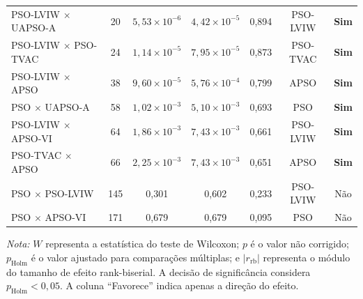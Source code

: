 \begin{table}[!htbp]
{\begin{tabular}{lcccccc}
            PSO-LVIW $\times$ UAPSO-A
            & 20
            & $5{,}53 \times 10^{-6}$
            & $4{,}42 \times 10^{-5}$
            & 0{,}894
            & PSO-LVIW
            & \textbf{Sim} \\
            
            PSO-LVIW $\times$ PSO-TVAC
            & 24
            & $1{,}14 \times 10^{-5}$
            & $7{,}95 \times 10^{-5}$
            & 0{,}873
            & PSO-TVAC
            & \textbf{Sim} \\
            
            PSO-LVIW $\times$ APSO
            & 38
            & $9{,}60 \times 10^{-5}$
            & $5{,}76 \times 10^{-4}$
            & 0{,}799
            & APSO
            & \textbf{Sim} \\
            
            PSO $\times$ UAPSO-A
            & 58
            & $1{,}02 \times 10^{-3}$
            & $5{,}10 \times 10^{-3}$
            & 0{,}693
            & PSO
            & \textbf{Sim} \\
            
            PSO-LVIW $\times$ APSO-VI
            & 64
            & $1{,}86 \times 10^{-3}$
            & $7{,}43 \times 10^{-3}$
            & 0{,}661
            & PSO-LVIW
            & \textbf{Sim} \\
            
            PSO-TVAC $\times$ APSO
            & 66
            & $2{,}25 \times 10^{-3}$
            & $7{,}43 \times 10^{-3}$
            & 0{,}651
            & APSO
            & \textbf{Sim} \\
            
            PSO $\times$ PSO-LVIW
            & 145
            & 0{,}301
            & 0{,}602
            & 0{,}233
            & PSO-LVIW
            & Não \\
            
            PSO $\times$ APSO-VI
            & 171
            & 0{,}679
            & 0{,}679
            & 0{,}095
            & PSO
            & Não \\
            
            \bottomrule
        \end{tabular}%
    }
    
    \vspace{0.4em}
    
    \begin{minipage}{\textwidth}
        \footnotesize
        \textit{Nota:} $W$ representa a estatística do teste de Wilcoxon;
        $p$ é o valor não corrigido; $p_{\mathrm{Holm}}$ é o valor
        ajustado para comparações múltiplas; e
        $|r_{\mathrm{rb}}|$ representa o módulo do tamanho de efeito
        rank-biserial. A decisão de significância considera
        $p_{\mathrm{Holm}} < 0{,}05$. A coluna ``Favorece'' indica
        apenas a direção do efeito.
    \end{minipage}
\end{table}
